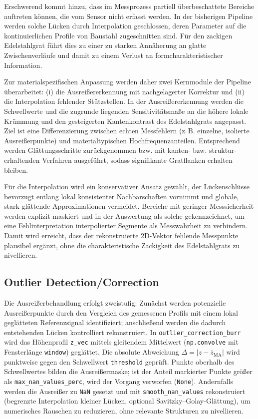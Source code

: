 Erschwerend kommt hinzu, dass im Messprozess partiell überbeschattete Bereiche auftreten können, die vom Sensor nicht erfasst werden. In der bisherigen Pipeline werden solche Lücken durch Interpolation geschlossen, deren Parameter auf die kontinuierlichen Profile von Baustahl zugeschnitten sind. Für den zackigen Edelstahlgrat führt dies zu einer zu starken Annäherung an glatte Zwischenverläufe und damit zu einem Verlust an formcharakteristischer Information.

Zur materialspezifischen Anpassung werden daher zwei Kernmodule der Pipeline überarbeitet: (i) die Ausreißererkennung mit nachgelagerter Korrektur und (ii) die Interpolation fehlender Stützstellen. In der Ausreißererkennung werden die Schwellwerte und die zugrunde liegenden Sensitivitätsmaße an die höhere lokale Krümmung und den gesteigerten Kantenkontrast des Edelstahlgrats angepasst. Ziel ist eine Differenzierung zwischen echten Messfehlern (z.\,B. einzelne, isolierte Ausreißerpunkte) und materialtypischen Hochfrequenzanteilen. Entsprechend werden Glättungsschritte zurückgenommen bzw. mit kanten- bzw. struktur­erhaltenden Verfahren ausgeführt, sodass signifikante Gratflanken erhalten bleiben. 

Für die Interpolation wird ein konservativer Ansatz gewählt, der Lückenschlüsse bevorzugt entlang lokal konsistenter Nachbarschaften vornimmt und globale, stark glättende Approximationen vermeidet. Bereiche mit geringer Messsicherheit werden explizit maskiert und in der Auswertung als solche gekennzeichnet, um eine Fehlinterpretation interpolierter Segmente als Messwahrheit zu verhindern. Damit wird erreicht, dass der rekonstruierte 2D-Vektor fehlende Messpunkte plausibel ergänzt, ohne die charakteristische Zackigkeit des Edelstahlgrats zu nivellieren.

\subsection{Outlier Detection/Correction}

Die Ausreißerbehandlung erfolgt zweistufig: Zunächst werden potenzielle Ausreißerpunkte durch den Vergleich des gemessenen Profils mit einem lokal geglätteten Referenzsignal identifiziert; anschließend werden die dadurch entstehenden Lücken kontrolliert rekonstruiert. In \texttt{outlier\_correction\_burr} wird das Höhenprofil \texttt{z\_vec} mittels gleitendem Mittelwert (\texttt{np.convolve} mit Fensterlänge \texttt{window}) geglättet. Die absolute Abweichung \(\Delta=\lvert z-\overline{z}_{\text{MA}}\rvert\) wird punktweise gegen den Schwellwert \texttt{threshold} geprüft. Punkte oberhalb des Schwellwertes bilden die Ausreißermaske; ist der Anteil markierter Punkte größer als \texttt{max\_nan\_values\_perc}, wird der Vorgang verworfen (\texttt{None}). Andernfalls werden die Ausreißer zu \texttt{NaN} gesetzt und mit \texttt{smooth\_nan\_values} rekonstruiert (begrenzte Interpolation kleiner Lücken, optional Savitzky–Golay-Glättung), um numerisches Rauschen zu reduzieren, ohne relevante Strukturen zu nivellieren.

